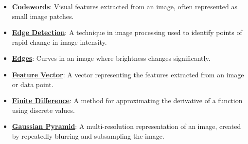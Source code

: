 \documentclass{article}%
\begin{document}
\begin{itemize}[leftmargin=*]
\item \href{https://purdue.brightspace.com/d2l/common/assets/pdfjs-d2l-dist/1.0.14-legacy/web/viewer.html?file=%2Fcontent%2Fenforced%2F1095467-wl.202510.CS.24300.001%2F08L2-Feature Extraction.pdf%3Fou%3D1095467&lang=en-us&container=d2l-fileviewer-rendered-pdf&fullscreen=d2l-fileviewer-rendered-pdf-dialog&height=667#page=2}{\textbf{Codewords}}: Visual features extracted from an image, often represented as small image patches.%
\item \href{https://purdue.brightspace.com/d2l/common/assets/pdfjs-d2l-dist/1.0.14-legacy/web/viewer.html?file=%2Fcontent%2Fenforced%2F1095467-wl.202510.CS.24300.001%2F08L2-Feature Extraction.pdf%3Fou%3D1095467&lang=en-us&container=d2l-fileviewer-rendered-pdf&fullscreen=d2l-fileviewer-rendered-pdf-dialog&height=667#page=4}{\textbf{Edge Detection}}: A technique in image processing used to identify points of rapid change in image intensity.%
\item \href{https://purdue.brightspace.com/d2l/common/assets/pdfjs-d2l-dist/1.0.14-legacy/web/viewer.html?file=%2Fcontent%2Fenforced%2F1095467-wl.202510.CS.24300.001%2F08L2-Feature Extraction.pdf%3Fou%3D1095467&lang=en-us&container=d2l-fileviewer-rendered-pdf&fullscreen=d2l-fileviewer-rendered-pdf-dialog&height=667#page=8}{\textbf{Edges}}: Curves in an image where brightness changes significantly.%
\item \href{https://purdue.brightspace.com/d2l/common/assets/pdfjs-d2l-dist/1.0.14-legacy/web/viewer.html?file=%2Fcontent%2Fenforced%2F1095467-wl.202510.CS.24300.001%2F08L2-Feature Extraction.pdf%3Fou%3D1095467&lang=en-us&container=d2l-fileviewer-rendered-pdf&fullscreen=d2l-fileviewer-rendered-pdf-dialog&height=667#page=3}{\textbf{Feature Vector}}: A vector representing the features extracted from an image or data point.%
\item \href{https://purdue.brightspace.com/d2l/common/assets/pdfjs-d2l-dist/1.0.14-legacy/web/viewer.html?file=%2Fcontent%2Fenforced%2F1095467-wl.202510.CS.24300.001%2F08L2-Feature Extraction.pdf%3Fou%3D1095467&lang=en-us&container=d2l-fileviewer-rendered-pdf&fullscreen=d2l-fileviewer-rendered-pdf-dialog&height=667#page=15}{\textbf{Finite Difference}}: A method for approximating the derivative of a function using discrete values.%
\item \href{https://purdue.brightspace.com/d2l/common/assets/pdfjs-d2l-dist/1.0.14-legacy/web/viewer.html?file=%2Fcontent%2Fenforced%2F1095467-wl.202510.CS.24300.001%2F08L2-Feature Extraction.pdf%3Fou%3D1095467&lang=en-us&container=d2l-fileviewer-rendered-pdf&fullscreen=d2l-fileviewer-rendered-pdf-dialog&height=667#page=31}{\textbf{Gaussian Pyramid}}: A multi-resolution representation of an image, created by repeatedly blurring and subsampling the image.%

\end{itemize}
\end{document}
